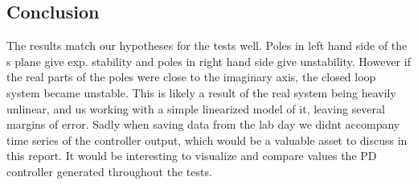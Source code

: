\subsection{Conclusion}
The results match our hypotheses for the tests well. Poles in left hand side of the s plane give exp. stability and poles in right hand side give unstability. However if the real parts of the poles were close to the 
imaginary axis, the closed loop system became unstable. This is likely a result of the real system being heavily unlinear, 
and us working with a simple linearized model of it, leaving several margins of error. Sadly when saving data from the lab day we didnt accompany time series of the controller output, which would be a valuable asset to discuss in this report. 
It would be interesting to visualize and compare values the PD controller generated throughout the tests.  

